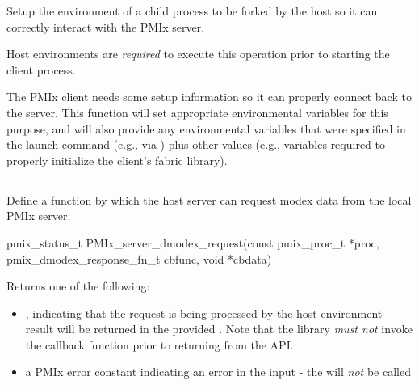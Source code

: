 \descr

Setup the environment of a child process to be forked by the host so it can correctly interact with the PMIx server.

\advicermstart
Host environments are \textit{required} to execute this operation prior to starting the client process.
\advicermend

The \ac{PMIx} client needs some setup information so it can properly connect back to the server.
This function will set appropriate environmental variables for this purpose, and will also provide any environmental variables that were specified in the launch command (e.g., via ) plus other values (e.g., variables required to properly initialize the client's fabric library).


\subsection{}

\summary

Define a function by which the host server can request modex data from the local PMIx server.

\format

\cspecificstart
\begin{codepar}
pmix_status_t PMIx_server_dmodex_request(const pmix_proc_t *proc,
                        pmix_dmodex_response_fn_t cbfunc,
                        void *cbdata)
\end{codepar}
\cspecificend

\begin{arglist}
\end{arglist}

Returns one of the following:

\begin{itemize}
    \item {}, indicating that the request is being processed by the host environment - result will be returned in the provided . Note that the library \emph{must not} invoke the callback function prior to returning from the \ac{API}.
    \item a PMIx error constant indicating an error in the input - the  will \textit{not} be called
\end{itemize}


